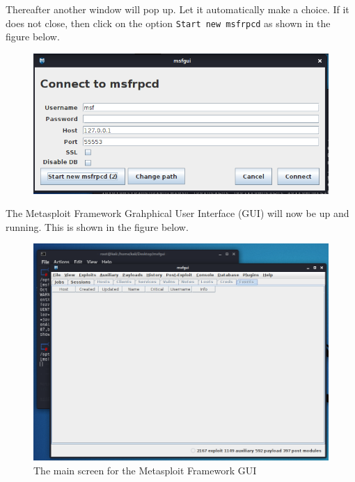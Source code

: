 \documentclass[a4paper, 12pt, titlepage]{report}
\begin{document}
Thereafter another window will pop up. Let it automatically make a choice. If it does not close, then click on the option \texttt{Start new msfrpcd} as shown in the figure below.
\begin{figure}[H]
    \centering
    \includegraphics[scale=0.4]{pics/prompt2.PNG}
\end{figure}
The Metasploit Framework Grahphical User Interface (GUI) will now be up and running. This is shown in the figure below.
\begin{figure}[H]
    \centering
    \includegraphics[scale=0.5]{pics/metaguimain.PNG}
    \caption{The main screen for the Metasploit Framework GUI}
\end{figure}
\end{document}
